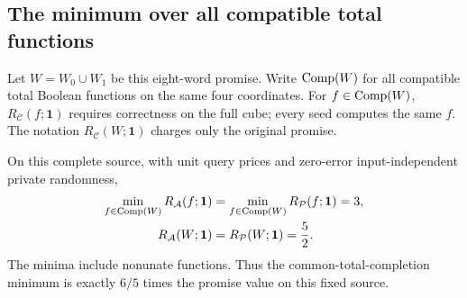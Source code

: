 \subsection{The minimum over all compatible total functions}
\label{sec:unit-common-completion}
Let $W=W_0\cup W_1$ be this eight-word promise. Write $\operatorname{Comp}(W)$ for
all compatible total Boolean functions on the same four coordinates.
For $f\in\operatorname{Comp}(W)$, $R_{\mathcal C}(f;\mathbf1)$ requires correctness
on the full cube; every seed computes the same $f$. The notation
$R_{\mathcal C}(W;\mathbf1)$ charges only the original promise.

\begin{proposition}
\label{prop:unit-common-completion}
On this complete source, with unit query prices and zero-error
input-independent private randomness,
\[
 \begin{aligned}
 \min_{f\in\operatorname{Comp}(W)}R_{\mathcal A}(f;\mathbf1)
 &=\min_{f\in\operatorname{Comp}(W)}R_{\mathcal P}(f;\mathbf1)=3,\\
 R_{\mathcal A}(W;\mathbf1)&=R_{\mathcal P}(W;\mathbf1)=\frac52.
 \end{aligned}
\]
The minima include nonunate functions. Thus the common-total-completion
minimum is exactly $6/5$ times the promise value on this fixed source.
\end{proposition}
